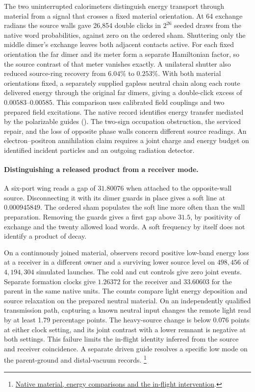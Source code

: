 \documentclass[11pt]{article}
\theoremstyle{definition}
\theoremstyle{remark}
\theoremstyle{plain}
\begin{document}
The two uninterrupted calorimeters distinguish energy transport through
material from a signal that crosses a fixed material orientation.
At 64 exchange radians the source walls gave 26,854 double clicks in
\(2^{26}\) seeded draws from the native word probabilities, against
zero on the ordered sham. Shuttering only the middle dimer's exchange
leaves both adjacent contacts active. For each fixed orientation the
far dimer and its meter form a separate Hamiltonian factor, so the
source contrast of that meter vanishes exactly. A unilateral shutter
also reduced source-ring recovery from \(6.04\%\) to \(0.253\%\).
With both material orientations fixed, a separately supplied gapless
neutral chain along each route delivered energy through the original
far dimers, giving a double-click excess of \(0.00583\)--\(0.00585\).
This comparison uses calibrated field couplings and two prepared field
excitations. The native record identifies energy transfer mediated by
the polarizable guides ().
The two-sign occupation obstruction, the serviced repair, and the
loss of opposite phase walls concern different source readings. An
electron--positron annihilation claim requires a joint charge and
energy budget on identified incident particles and an outgoing
radiation detector.

\paragraph{Distinguishing a released product from a receiver mode.}
A six-port wing reads a gap of \(31.80076\) when attached to the
opposite-wall source. Disconnecting it with its dimer guards in
place gives a soft line at \(0.000945849\). The ordered sham populates
the soft line more often than the wall preparation. Removing the
guards gives a first gap above \(31.5\), by positivity of exchange
and the twenty allowed load words. A soft frequency by itself
does not identify a product of decay.

On a continuously joined material, observers record positive
low-band energy loss at a receiver in a different owner and a
surviving lower source level on \(498{,}456\) of \(4{,}194{,}304\)
simulated launches. The cold and cut controls give zero joint
events. Separate formation clocks give \(1.26372\) for the receiver
and \(33.60603\) for the parent in the same native units. The counts
compare light energy deposition and source relaxation on the
prepared neutral material. On an independently qualified transmission
path, capturing a known neutral input changes the remote light
read by at least 1.79 percentage points. The heavy-source change is
below 0.076 points at either clock setting, and its joint contrast
with a lower remnant is negative at both settings. This failure
limits the in-flight identity inferred from the source and receiver
coincidence. A separate driven guide resolves a specific low mode
on the parent-ground and distal-vacuum records.%
\footnote{\href{https://github.com/FloatingPragma/observer-patch-holography/tree/main/model/candidate_laws/interval_echo/openwave/row_09_neutral}{Native material, energy comparisons and the in-flight intervention}.}
\end{document}
